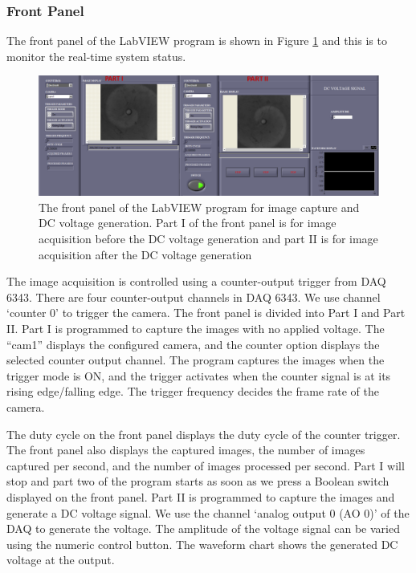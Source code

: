 \documentclass[journal=jacsat,manuscript=article]{achemso}
\begin{document}
\subsubsection{Front Panel}
The front panel of the LabVIEW program is shown in Figure
\ref{fig:ex3} and this is to monitor the real-time system status.
\begin{figure}[H]
    \centering
\includegraphics[width=\linewidth,height=0.6\linewidth]{Dc_frntpnl - Copy.png}
    \caption{The front panel of the LabVIEW program for image capture
      and DC voltage generation. Part I of the front panel is for
      image acquisition before the DC voltage generation and part II
      is for image acquisition after the DC voltage generation}
    \label{fig:ex3}
\end{figure}
The image acquisition is controlled using a counter-output trigger
from DAQ 6343. There are four counter-output channels in DAQ 6343. We
use channel ‘counter 0’ to trigger the camera. The front panel is
divided into Part I and Part II. Part I is programmed to capture the
images with no applied voltage. The “cam1” displays the configured
camera, and the counter option displays the selected counter output
channel. The program captures the images when the trigger mode is ON,
and the trigger activates when the counter signal is at its rising
edge/falling edge. The trigger frequency decides the frame rate of the
camera.

The duty cycle on the front panel displays the duty cycle of the
counter trigger. The front panel also displays the captured images,
the number of images captured per second, and the number of images
processed per second. Part I will stop and part two of the program
starts as soon as we press a Boolean switch displayed on the front
panel. Part II is programmed to capture the images and generate a DC
voltage signal. We use the channel ‘analog output 0 (AO 0)’ of the DAQ
to generate the voltage. The amplitude of the voltage signal can be
varied using the numeric control button. The waveform chart shows the
generated DC voltage at the output.
\end{document}
